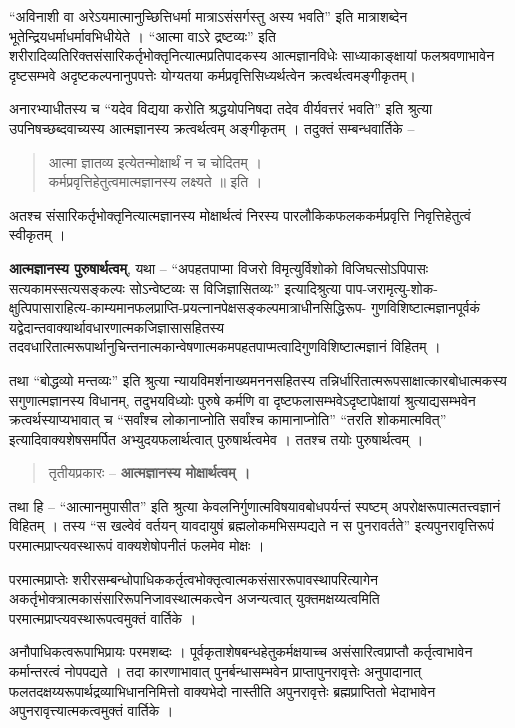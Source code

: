 “अविनाशी वा अरेऽयमात्मानुच्छित्तिधर्मा मात्राऽसंसर्गस्तु अस्य भवति” इति मात्राशब्देन भूतेन्द्रियधर्माधर्मावभिधीयेते । “आत्मा वाऽरे द्रष्टव्यः” इति शरीरादिव्यतिरिक्तसंसारिकर्तृभोक्तृनित्यात्मप्रतिपादकस्य आत्मज्ञानविधेः साध्याकाङ्क्षायां फलश्रवणाभावेन दृष्टसम्भवे अदृष्टकल्पनानुपपत्तेः योग्यतया कर्मप्रवृत्तिसिध्यर्थत्वेन क्रत्वर्थत्वमङ्गीकृतम्।

अनारभ्याधीतस्य च “यदेव विद्यया करोति श्रद्धयोपनिषदा तदेव वीर्यवत्तरं भवति” इति श्रुत्या उपनिषच्छब्दवाच्यस्य आत्मज्ञानस्य क्रत्वर्थत्वम् अङ्गीकृतम् । तदुक्तं सम्बन्धवार्तिके –
\begin{verse}
आत्मा ज्ञातव्य इत्येतन्मोक्षार्थं न च चोदितम् ।\\
कर्मप्रवृत्तिहेतुत्वमात्मज्ञानस्य लक्ष्यते ॥ इति ।
\end{verse}
अतश्च संसारिकर्तृभोक्तृनित्यात्मज्ञानस्य मोक्षार्थत्वं निरस्य पारलौकिकफलककर्मप्रवृत्ति निवृत्तिहेतुत्वं स्वीकृतम् ।

\textbf{आत्मज्ञानस्य पुरुषार्थत्वम्}, यथा – “अपहतपाप्मा विजरो विमृत्युर्विशोको विजिघत्सोऽपिपासः सत्यकामस्सत्यसङ्कल्पः सोऽन्वेष्टव्यः स विजिज्ञासितव्यः” इत्यादिश्रुत्या पाप-जरामृत्यु-शोक-क्षुत्पिपासाराहित्य-काम्यमानफलप्राप्ति-प्रयत्नानपेक्षसङ्कल्पमात्राधीनसिद्धिरूप- गुणविशिष्टात्मज्ञानपूर्वकं यद्वेदान्तवाक्यार्थावधारणात्मकजिज्ञासासहितस्य तदवधारितात्मरूपार्थानुचिन्तनात्मकान्वेषणात्मकमपहतपाप्मत्वादिगुणविशिष्टात्मज्ञानं विहितम् ।

तथा “बोद्धव्यो मन्तव्यः” इति श्रुत्या न्यायविमर्शनाख्यमननसहितस्य तन्निर्धारितात्मरूपसाक्षात्कारबोधात्मकस्य सगुणात्मज्ञानस्य विधानम्, तदुभयविध्योः पुरुषे कर्मणि वा दृष्टफलासम्भवेऽदृष्टापेक्षायां श्रुत्याद्यसम्भवेन क्रत्वर्थस्याप्यभावात् च “सर्वांश्च लोकानाप्नोति सर्वांश्च कामानाप्नोति” “तरति शोकमात्मवित्” इत्यादिवाक्यशेषसमर्पित अभ्युदयफलार्थत्वात् पुरुषार्थत्वमेव । ततश्च तयोः पुरुषार्थत्वम् ।
\begin{verse}
तृतीयप्रकारः – \textbf{आत्मज्ञानस्य मोक्षार्थत्वम् ।}
\end{verse}
तथा हि – “आत्मानमुपासीत” इति श्रुत्या केवलनिर्गुणात्मविषयावबोधपर्यन्तं स्पष्टम् अपरोक्षरूपात्मतत्त्वज्ञानं विहितम् । तस्य “स खल्वेवं वर्तयन् यावदायुषं ब्रह्मलोकमभिसम्पद्यते न स पुनरावर्तते” इत्यपुनरावृत्तिरूपं परमात्मप्राप्त्यवस्थारूपं वाक्यशेषोपनीतं फलमेव मोक्षः ।

परमात्मप्राप्तेः शरीरसम्बन्धोपाधिककर्तृत्वभोक्तृत्वात्मकसंसाररूपावस्थापरित्यागेन अकर्तृभोक्त्रात्मकासंसारिरूपनिजावस्थात्मकत्वेन अजन्यत्वात् युक्तमक्षय्यत्वमिति परमात्मप्राप्त्यवस्थारूपत्वमुक्तं वार्तिके ।

अनौपाधिकत्वरूपाभिप्रायः परमशब्दः । पूर्वकृताशेषबन्धहेतुकर्मक्षयाच्च असंसारित्वप्राप्तौ कर्तृत्वाभावेन कर्मान्तरत्वं नोपपद्यते । तदा कारणाभावात् पुनर्बन्धासम्भवेन प्राप्तापुनरावृत्तेः अनुपादानात् फलतदक्षय्यरूपार्थद्रव्याभिधाननिमित्तो वाक्यभेदो नास्तीति अपुनरावृत्तेः ब्रह्मप्राप्तितो भेदाभावेन अपुनरावृत्त्यात्मकत्वमुक्तं वार्तिके ।

